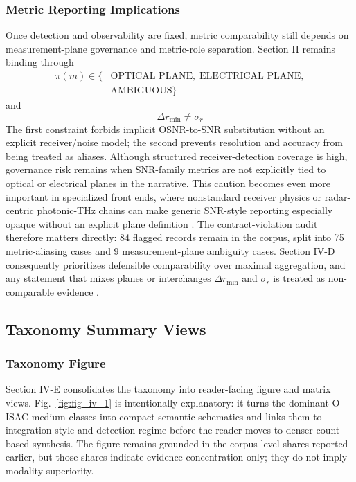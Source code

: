 \documentclass[letterpaper,journal]{IEEEtran}
\begin{document}
\subsubsection{Metric Reporting Implications}
Once detection and observability are fixed, metric comparability still depends on measurement-plane governance and metric-role separation. Section II remains binding through
\begin{equation}
    \begin{aligned}
        \pi(m)\in\{ & \text{OPTICAL\_PLANE},\;\text{ELECTRICAL\_PLANE}, \\
                    & \text{AMBIGUOUS}\}
    \end{aligned}
\end{equation}
and
\begin{equation}
    \Delta r_{\min}\neq \sigma_r
\end{equation}
The first constraint forbids implicit OSNR-to-SNR substitution without an explicit receiver/noise model; the second prevents resolution and accuracy from being treated as aliases. Although structured receiver-detection coverage is high, governance risk remains when SNR-family metrics are not explicitly tied to optical or electrical planes in the narrative. This caution becomes even more important in specialized front ends, where nonstandard receiver physics or radar-centric photonic-THz chains can make generic SNR-style reporting especially opaque without an explicit plane definition \cite{O_ISAC_136,O_ISAC_349}. The contract-violation audit therefore matters directly: 84 flagged records remain in the corpus, split into 75 metric-aliasing cases and 9 measurement-plane ambiguity cases. Section IV-D consequently prioritizes defensible comparability over maximal aggregation, and any statement that mixes planes or interchanges $\Delta r_{\min}$ and $\sigma_r$ is treated as non-comparable evidence \cite{O_ISAC_132,O_ISAC_061,O_ISAC_013,O_ISAC_050,O_ISAC_056}.

\subsection{Taxonomy Summary Views}

\subsubsection{Taxonomy Figure}
Section IV-E consolidates the taxonomy into reader-facing figure and matrix views. Fig.~\ref{fig:fig_iv_1} is intentionally explanatory: it turns the dominant O-ISAC medium classes into compact semantic schematics and links them to integration style and detection regime before the reader moves to denser count-based synthesis. The figure remains grounded in the corpus-level shares reported earlier, but those shares indicate evidence concentration only; they do not imply modality superiority.
\end{document}
